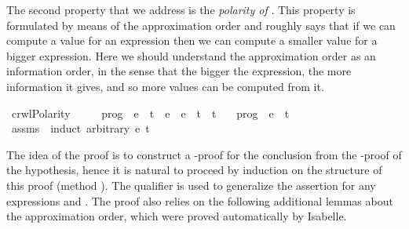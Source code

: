 \documentclass{llncs}
\newenvironment{isacode}
{\begin{list}{}{
\setlength{\leftmargin}{4pt}
\setlength{\rightmargin}{0pt}
\setlength{\listparindent}{0pt}\raggedright
\setlength{\itemsep}{0pt}
\setlength{\parsep}{0pt}
\normalfont\ttfamily }\item[]}
{\end{list}}
\begin{document}
\medskip

The second property that we address is the \emph{polarity of \crwl}.
This property is formulated by means of the approximation order and
roughly says that if we can compute a value for an expression then we
can compute a smaller value for a bigger expression. Here we should
understand the approximation order as an information order, in the
sense that the bigger the expression, the more information it gives,
and so more values can be computed from
it. 

\medskip

\begin{minipage}{\linewidth}
\begin{isacode}
\isamarkupfalse \ crwlPolarity\ {\isacharcolon}\ \isanewline
\ \ \ {\isachardoublequoteopen}prog\ {\isasymturnstile}\ e\ {\isasymrightarrow}\ t{\isachardoublequoteclose}\ \ {\isachardoublequoteopen}e\ {\isasymsqsubseteq}\ e{\isacharprime}{\isachardoublequoteclose}\ \ {\isachardoublequoteopen}t{\isacharprime}\ {\isasymsqsubseteq}\ t{\isachardoublequoteclose}\isanewline
\ \ \ {\isachardoublequoteopen}prog\ {\isasymturnstile}\ e{\isacharprime}\ {\isasymrightarrow}\ t{\isacharprime}{\isachardoublequoteclose}\isanewline
\isadelimproof
\endisadelimproof
\isatagproof
{}\isamarkupfalse \ assms\ \isamarkupfalse \ {\isacharparenleft}induct\ arbitrary{\isacharcolon}\ e{\isacharprime}\ t{\isacharprime}{\isacharparenright}
\end{isacode}
\end{minipage}

\medskip

\noindent The idea of the proof is to construct a \crwl-proof for the conclusion
from the \crwl-proof of the hypothesis, hence it is natural to proceed
by induction on the structure of this proof (method ).
The qualifier  is used to generalize the assertion
for any expressions  and . The proof also
relies on the following additional lemmas about the approximation
order, which were proved automatically by Isabelle.

\medskip
\end{document}
